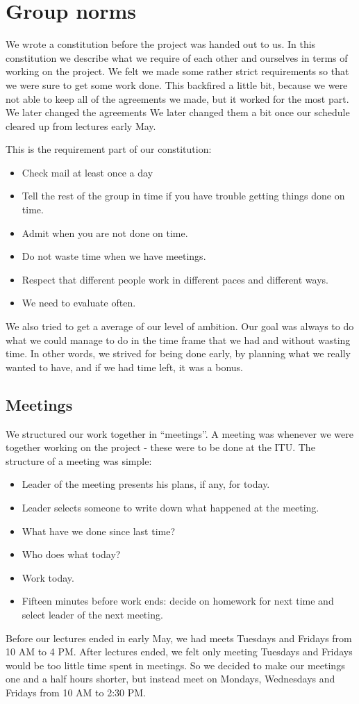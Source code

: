 \chapter{Group norms}
\label{GN}
We wrote a constitution before the project was handed out to us. In this
constitution we describe what we require of each other and ourselves in terms of
working on the project. We felt we made some rather strict requirements so that
we were sure to get some work done. This backfired a little bit, because we were
not able to keep all of the agreements we made, but it worked for the most part.
We later changed the agreements  We later changed them a bit once our schedule
cleared up from lectures early May.

This is the requirement part of our constitution:
\begin{itemize}
  \item Check mail at least once a day
  \item Tell the rest of the group in time if you have trouble getting things done on
  time.
  \item Admit when you are not done on time.
  \item Do not waste time when we have meetings.
  \item Respect that different people work in different paces and different
  ways.
  \item We need to evaluate often.
\end{itemize}

We also tried to get a average of our level of ambition. Our goal was always to
do what we could manage to do in the time frame that we had and without wasting
time. In other words, we strived for being done early, by planning what we really 
wanted to have, and if we had time left, it was a bonus.

\section{Meetings}
\label{GN-M}
We structured our work together in ``meetings''. A meeting was whenever we were
together working on the project - these were to be done at the ITU. The
structure of a meeting was simple:
\begin{itemize}
  \item Leader of the meeting presents his plans, if any, for today. 
  \item Leader selects someone to write down what happened at the meeting.
  \item What have we done since last time?
  \item Who does what today?
  \item Work today.
  \item Fifteen minutes before work ends: decide on homework for next time and
  select leader of the next meeting.
\end{itemize}
Before our lectures ended in early May, we had meets Tuesdays and Fridays from
10 AM to 4 PM. After lectures ended, we felt only meeting Tuesdays and Fridays
would be too little time spent in meetings. So we decided to make our meetings
one and a half hours shorter, but instead meet on Mondays, Wednesdays and
Fridays from 10 AM to 2:30 PM.
